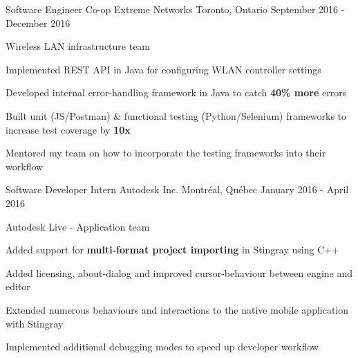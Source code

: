 


\begin{cventries}


\cventry
{Software Engineer Co-op}
{Extreme Networks}
{Toronto, Ontario}
{September 2016 - December 2016}
{ %
Wireless LAN infrastructure team
\begin{cvitems}
\item[]
\item {Implemented REST API in Java for configuring WLAN controller settings}
\item {Developed internal error-handling framework in Java to catch \textbf{40\% more} errors}
\item {Built unit (JS/Postman) \& functional testing (Python/Selenium) frameworks to increase test coverage by \textbf{10x}}
\item {Mentored my team on how to incorporate the testing frameworks into their workflow}
\end{cvitems}
}


\cventry
{Software Developer Intern}
{Autodesk Inc.}
{Montréal, Québec}
{January 2016 - April 2016}
{ %
Autodesk Live - Application team
\begin{cvitems}
\item[]
\item {Added support for \textbf{multi-format project importing} in Stingray using C++}
\item {Added licensing, about-dialog and improved cursor-behaviour between engine and editor}
\item {Extended numerous behaviours and interactions to the native mobile application with Stingray}
\item {Implemented additional debugging modes to speed up developer workflow}
\end{cvitems}
}


\end{cventries}
